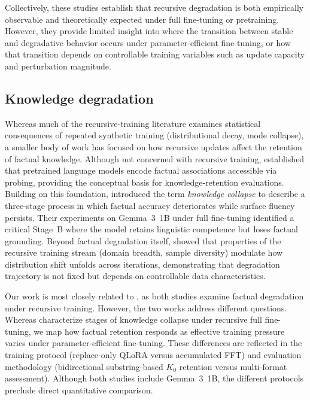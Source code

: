 \documentclass[a4paper,fleqn]{cas-dc}
\newif\ifshowchanges
\newcommand{\rev}[1]{\ifshowchanges{\color{blue}#1}\else{#1}\fi}
\begin{document}
Collectively, these studies establish that recursive degradation is both
empirically observable and theoretically expected under full fine-tuning or
pretraining. However, they provide limited insight into where the transition
between stable and degradative behavior occurs under parameter-efficient
fine-tuning, or how that transition depends on controllable training variables
such as update capacity and perturbation magnitude.

\subsection{Knowledge degradation}

Whereas much of the recursive-training literature examines statistical
consequences of repeated synthetic training (distributional decay, mode
collapse), a smaller body of work has focused on how recursive updates affect
the retention of factual knowledge. Although not concerned with recursive
training, \citet{petroni2019} established that pretrained language models encode
factual associations accessible via probing, providing the conceptual basis for
knowledge-retention evaluations. Building on this foundation,
\citet{keisha2025} introduced the term \textit{knowledge collapse} to describe a
three-stage process in which factual accuracy deteriorates while surface fluency
persists. Their experiments on Gemma~3~1B under full fine-tuning identified a
critical Stage~B where the model retains linguistic competence but loses factual
grounding. Beyond factual degradation itself, \citet{kovac2025recursive}
showed that properties of the recursive training stream (domain breadth, sample
diversity) modulate how distribution shift unfolds across iterations,
demonstrating that degradation trajectory is not fixed but depends on
controllable data characteristics.

Our work is most closely related to \citet{keisha2025}, as both studies examine
factual degradation under recursive training. However, the two works address
different questions. Whereas \citet{keisha2025} characterize stages of knowledge
collapse under recursive full fine-tuning, we map how factual retention responds
as effective training pressure varies under parameter-efficient fine-tuning.
These differences are reflected in the training protocol (replace-only QLoRA
versus accumulated FFT) and evaluation methodology (\rev{bidirectional substring-based $K_0$ retention}
versus multi-format assessment). Although both studies include Gemma~3~1B, the
different protocols preclude direct quantitative comparison.
\end{document}
